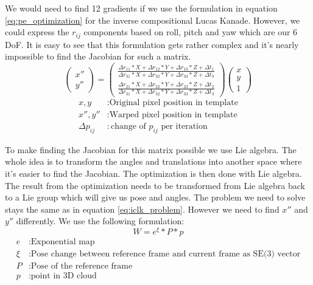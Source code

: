 \documentclass[11pt,a4paper,titlepage,oneside]{report}
\begin{document}
We would need to find 12 gradients if we use the formulation in equation \ref{eq:pe_optimization} for the inverse compositional Lucas Kanade. However, we could express the $r_{ij}$ components based on roll, pitch and yaw which are our 6 DoF. It is easy to see that this formulation gets rather complex and it's nearly impossible to find the Jacobian for such a matrix.
\begin{equation}\label{eq:pe_optimization}
	\begin{pmatrix}
		x'' \\
		y''
	\end{pmatrix}=
	\begin{pmatrix}
		\frac{\Delta r_{11}*X + \Delta r_{12}*Y + \Delta r_{13}*Z + \Delta t_{1}}{ \Delta r_{31}*X + \Delta r_{32}*Y + \Delta r_{33}*Z + \Delta t_{3}}  \\
		\frac{\Delta r_{21}*X + \Delta r_{22}*Y + \Delta r_{23}*Z + \Delta t_{2}}{ \Delta r_{31}*X + \Delta r_{32}*Y + \Delta r_{33}*Z + \Delta t_{3}}
	\end{pmatrix}
	\begin{pmatrix}
		x\\
		y\\
		1
	\end{pmatrix}
\end{equation}
\begin{align*}
	x,y						&:	\text{Original pixel position in template}\\
	x'',y''				&:	\text{Warped pixel position in template}\\
	\Delta p_{ij}	&:	\text{change of $p_{ij}$ per iteration}
\end{align*}

To make finding the Jacobian for this matrix possible we use Lie algebra. The whole idea is to transform the angles and translations into another space where it's easier to find the Jacobian. The optimization is then done with Lie algebra. The result from the optimization needs to be transformed from Lie algebra back to a Lie group which will give us pose and angles. The problem we need to solve stays the same as in equation \ref{eq:iclk_problem}. However we need to find $x''$ and $y''$ differently. We use the following formulation:
\begin{equation}
	W=e^{\xi}*P*p
\end{equation}
\begin{align*}
	e			&:	\text{Exponential map}\\
	\xi		&:	\text{Pose change between reference frame and current frame as SE(3) vector}\\
	P			&:	\text{Pose of the reference frame}\\
	p			&:	\text{point in 3D cloud}
\end{align*}
\end{document}

